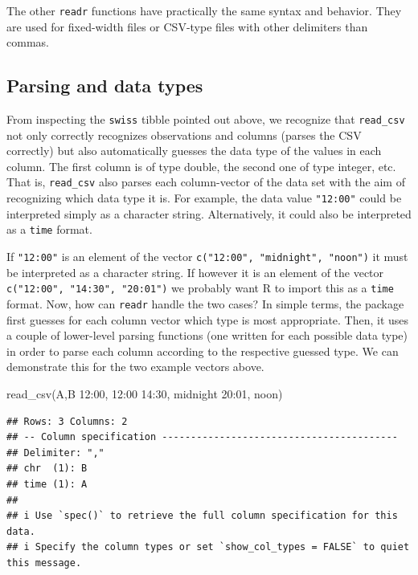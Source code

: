\documentclass[
  12pt,
]{style/krantz}
\newenvironment{Shaded}{\begin{snugshade}}{\end{snugshade}}
\newcommand{\FunctionTok}[1]{\textcolor[rgb]{0.00,0.00,0.00}{#1}}
\newcommand{\NormalTok}[1]{#1}
\newcommand{\StringTok}[1]{\textcolor[rgb]{0.31,0.60,0.02}{#1}}
\begin{document}
The other \texttt{readr} functions have practically the same syntax and behavior. They are used for fixed-width files or CSV-type files with other delimiters than commas.

\hypertarget{parsing-and-data-types}{%
\subsection{Parsing and data types}\label{parsing-and-data-types}}

From inspecting the \texttt{swiss} tibble pointed out above, we recognize that \texttt{read\_csv} not only correctly recognizes observations and columns (parses the CSV correctly) but also automatically guesses the data type of the values in each column. The first column is of type double, the second one of type integer, etc. That is, \texttt{read\_csv} also parses each column-vector of the data set with the aim of recognizing which data type it is. For example, the data value \texttt{"12:00"} could be interpreted simply as a character string. Alternatively, it could also be interpreted as a \texttt{time} format.

If \texttt{"12:00"} is an element of the vector \texttt{c("12:00",\ "midnight",\ "noon")} it must be interpreted as a character string. If however it is an element of the vector \texttt{c("12:00",\ "14:30",\ "20:01")} we probably want R to import this as a \texttt{time} format. Now, how can \texttt{readr} handle the two cases? In simple terms, the package first guesses for each column vector which type is most appropriate. Then, it uses a couple of lower-level parsing functions (one written for each possible data type) in order to parse each column according to the respective guessed type. We can demonstrate this for the two example vectors above.

\begin{Shaded}
\begin{Highlighting}[]
\FunctionTok{read\_csv}\NormalTok{(}\StringTok{\textquotesingle{}A,B}
\StringTok{         12:00, 12:00}
\StringTok{         14:30, midnight}
\StringTok{         20:01, noon\textquotesingle{}}\NormalTok{)}
\end{Highlighting}
\end{Shaded}

\begin{verbatim}
## Rows: 3 Columns: 2
## -- Column specification -----------------------------------------
## Delimiter: ","
## chr  (1): B
## time (1): A
## 
## i Use `spec()` to retrieve the full column specification for this data.
## i Specify the column types or set `show_col_types = FALSE` to quiet this message.
\end{verbatim}
\end{document}
